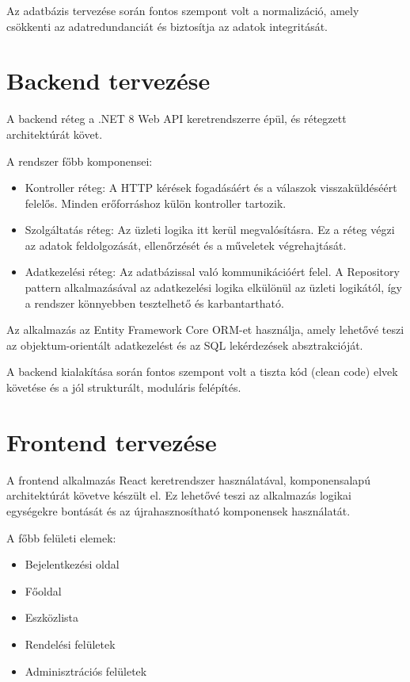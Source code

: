 \documentclass[
]{thesis-ekf}
\theoremstyle{definition}
\theoremstyle{remark}
\begin{document}
Az adatbázis tervezése során fontos szempont volt a normalizáció, amely csökkenti az adatredundanciát és biztosítja az adatok integritását.

\section{Backend tervezése}
A backend réteg a .NET 8 Web API keretrendszerre épül, és rétegzett architektúrát követ.

A rendszer főbb komponensei:

\begin{itemize}
	\item Kontroller réteg:
	A HTTP kérések fogadásáért és a válaszok visszaküldéséért felelős. Minden erőforráshoz külön kontroller tartozik.
	
	\item Szolgáltatás réteg:
	Az üzleti logika itt kerül megvalósításra. Ez a réteg végzi az adatok feldolgozását, ellenőrzését és a műveletek végrehajtását.
	
	\item Adatkezelési réteg:
	Az adatbázissal való kommunikációért felel. A Repository pattern alkalmazásával az adatkezelési logika elkülönül az üzleti logikától, így a rendszer könnyebben tesztelhető és karbantartható.
\end{itemize}

Az alkalmazás az Entity Framework Core ORM-et használja, amely lehetővé teszi az objektum-orientált adatkezelést és az SQL lekérdezések absztrakcióját.

A backend kialakítása során fontos szempont volt a tiszta kód (clean code) elvek követése és a jól strukturált, moduláris felépítés.

\section{Frontend tervezése}
A frontend alkalmazás React keretrendszer használatával, komponensalapú architektúrát követve készült el. Ez lehetővé teszi az alkalmazás logikai egységekre bontását és az újrahasznosítható komponensek használatát.

A főbb felületi elemek:
\begin{itemize}
	\item Bejelentkezési oldal
	\item Főoldal
	\item Eszközlista
	\item Rendelési felületek
	\item Adminisztrációs felületek
\end{itemize}
\end{document}
